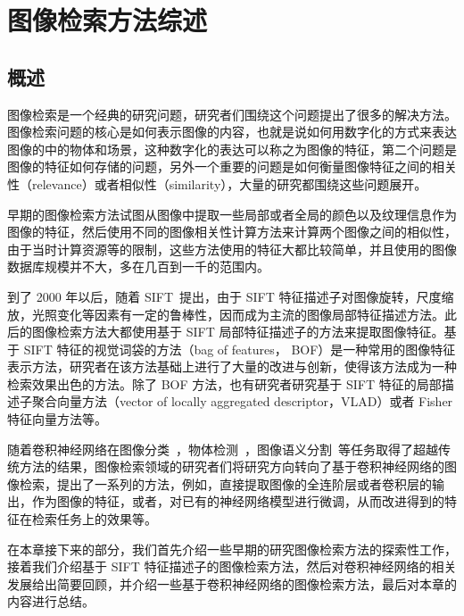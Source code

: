 
\chapter{图像检索方法综述}\label{chapter:overview_related_work}

\section{概述}
图像检索是一个经典的研究问题，研究者们围绕这个问题提出了很多的解决方法。图像检索问题的核心是如何表示图像的内容，也就是说如何用数字化的方式来表达图像的中的物体和场景，这种数字化的表达可以称之为图像的特征，第二个问题是图像的特征如何存储的问题，另外一个重要的问题是如何衡量图像特征之间的相关性（relevance）或者相似性（similarity），大量的研究都围绕这些问题展开。

早期的图像检索方法试图从图像中提取一些局部或者全局的颜色以及纹理信息作为图像的特征，然后使用不同的图像相关性计算方法来计算两个图像之间的相似性，由于当时计算资源等的限制，这些方法使用的特征大都比较简单，并且使用的图像数据库规模并不大，多在几百到一千的范围内。

到了 2000 年以后，随着 SIFT~\cite{Lowe1999ObjectRF}提出，由于 SIFT 特征描述子对图像旋转，尺度缩放，光照变化等因素有一定的鲁棒性，因而成为主流的图像局部特征描述方法。此后的图像检索方法大都使用基于 SIFT 局部特征描述子的方法来提取图像特征。基于 SIFT 特征的视觉词袋的方法（bag of features， BOF）是一种常用的图像特征表示方法，研究者在该方法基础上进行了大量的改进与创新，使得该方法成为一种检索效果出色的方法。除了 BOF 方法，也有研究者研究基于 SIFT 特征的局部描述子聚合向量方法（vector of locally aggregated descriptor，VLAD）或者 Fisher 特征向量方法等。

随着卷积神经网络在图像分类~\cite{Russakovsky2015ImageNetLS,Simonyan2014VeryDC,Szegedy2015GoingDW,He2016DeepRL}，物体检测~\cite{Liu2016SSDSS,Redmon2016YouOL,Lin2017FocalLF,Ren2017FasterRT}，图像语义分割~\cite{Shelhamer2017FullyCN,Chen2018DeepLabSI,Noh2015LearningDN}等任务取得了超越传统方法的结果，图像检索领域的研究者们将研究方向转向了基于卷积神经网络的图像检索，提出了一系列的方法，例如，直接提取图像的全连阶层或者卷积层的输出，作为图像的特征，或者，对已有的神经网络模型进行微调，从而改进得到的特征在检索任务上的效果等。

在本章接下来的部分，我们首先介绍一些早期的研究图像检索方法的探索性工作，接着我们介绍基于 SIFT 特征描述子的图像检索方法，然后对卷积神经网络的相关发展给出简要回顾，并介绍一些基于卷积神经网络的图像检索方法，最后对本章的内容进行总结。

